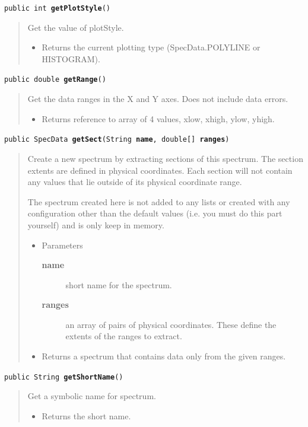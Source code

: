\documentclass[twoside,11pt]{article}
\renewcommand{\_}{\texttt{\symbol{95}}}
\newcommand{\method}[1]{\texttt{#1}}
\newenvironment{desc}{\begin{quote}}{\end{quote}}
\begin{document}
\method{public int \textbf{getPlotStyle}()\label{l63}\label{l64}}
\begin{desc}Get the value of plotStyle.
\begin{itemize}
\item{Returns the current plotting type (SpecData.POLYLINE or
            HISTOGRAM). }
\end{itemize}
\end{desc}

\method{public double \textbf{getRange}()\label{l65}\label{l66}}
\begin{desc}Get the data ranges in the X and Y axes. Does not include data
 errors.
\begin{itemize}
\item{Returns reference to array of 4 values, xlow, xhigh, ylow, yhigh. }
\end{itemize}
\end{desc}

\method{public SpecData \textbf{getSect}(\texttt{String} \textbf{name}, \texttt{double[]} \textbf{ranges})\label{l67}\label{l68}}
\begin{desc}Create a new spectrum by extracting sections of this spectrum.
 The section extents are defined in physical coordinates.
 Each section will not contain any values that lie outside of
 its physical coordinate range.

 The spectrum created here is not added to any lists or created
 with any configuration other than the default values (i.e. you
 must do this part yourself) and is only keep in memory.
\begin{itemize}
\item{Parameters
  \begin{description}
   \item[\textbf{name}]{short name for the spectrum.}
   \item[\textbf{ranges}]{an array of pairs of physical coordinates. These
               define the extents of the ranges to extract.}
  \end{description}}
\end{itemize}
\begin{itemize}
\item{Returns a spectrum that contains data only from the given
         ranges. }
\end{itemize}
\end{desc}

\method{public String \textbf{getShortName}()\label{l69}\label{l70}}
\begin{desc}Get a symbolic name for spectrum.
\begin{itemize}
\item{Returns the short name. }
\end{itemize}
\end{desc}
\end{document}
